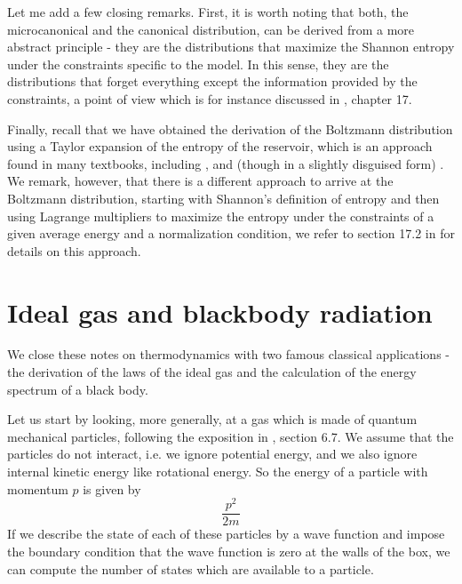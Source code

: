 \documentclass[a4paper, draft]{article}
\theoremstyle{own}
\theoremstyle{remark}
\begin{document}
Let me add a few closing remarks. First, it is worth noting that both, the microcanonical and the canonical distribution, can be derived from a more abstract principle - they are the distributions that maximize the Shannon entropy under the constraints specific to the model. In this sense, they are the distributions that forget everything except the information provided by the constraints, a point of view which is for instance discussed in \cite{Callen}, chapter 17.

Finally, recall that we have obtained the derivation of the Boltzmann distribution using a Taylor expansion of the entropy of the reservoir, which is an approach found in many textbooks, including \cite{Callen}, and (though in a slightly disguised form) \cite{Schroeder}. We remark, however, that there is a different approach to arrive at the Boltzmann distribution, starting with Shannon's definition of entropy and then using Lagrange multipliers to maximize the entropy under the constraints of a given average energy and a normalization condition, we refer to section 17.2 in \cite{Callen} for details on this approach.

\section{Ideal gas and blackbody radiation}

We close these notes on thermodynamics with two famous classical applications - the derivation of the laws of the ideal gas and the calculation of the energy spectrum of a black body.

Let us start by looking, more generally, at a gas which is made of quantum mechanical particles, following the exposition in \cite{Schroeder}, section 6.7.  We assume that the particles do not interact, i.e. we ignore potential energy, and we also ignore internal kinetic energy like rotational energy. So the energy of a particle with momentum $p$ is given by
$$
\frac{p^2}{2m}
$$
If we describe the state of each of these particles by a wave function and impose the boundary condition that the wave function is zero at the walls of the box, we can compute the number of states which are available to a particle. 
\end{document}
